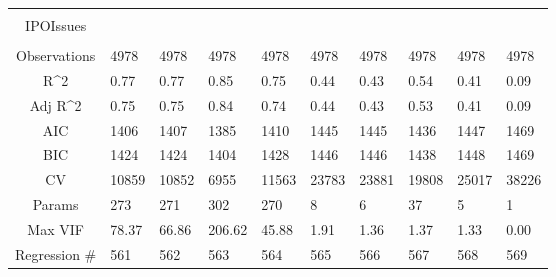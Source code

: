 \documentclass{article}
\begin{document}
\begin{table}[H]
\begin{tabular}{|clllllllll|}
   &  &  &  &  &  &  &  &  &  \\ 
  IPOIssues &  &  &  &  &  &  &  &  &  \\ 
   &  &  &  &  &  &  &  &  &  \\ 
  \hline 
 Observations & 4978 & 4978 & 4978 & 4978 & 4978 & 4978 & 4978 & 4978 & 4978 \\ 
  R^2 & 0.77 & 0.77 & 0.85 & 0.75 & 0.44 & 0.43 & 0.54 & 0.41 & 0.09 \\ 
  Adj R^2 & 0.75 & 0.75 & 0.84 & 0.74 & 0.44 & 0.43 & 0.53 & 0.41 & 0.09 \\ 
  AIC & 1406 & 1407 & 1385 & 1410 & 1445 & 1445 & 1436 & 1447 & 1469 \\ 
  BIC & 1424 & 1424 & 1404 & 1428 & 1446 & 1446 & 1438 & 1448 & 1469 \\ 
  CV & 10859 & 10852 & 6955 & 11563 & 23783 & 23881 & 19808 & 25017 & 38226 \\ 
  Params & 273 & 271 & 302 & 270 & 8 & 6 & 37 & 5 & 1 \\ 
  Max VIF & 78.37 & 66.86 & 206.62 & 45.88 & 1.91 & 1.36 & 1.37 & 1.33 & 0.00 \\ 
  Regression \# & 561 & 562 & 563 & 564 & 565 & 566 & 567 & 568 & 569 \\ 
   \hline
\end{tabular}
 
\end{table}
\end{document}
